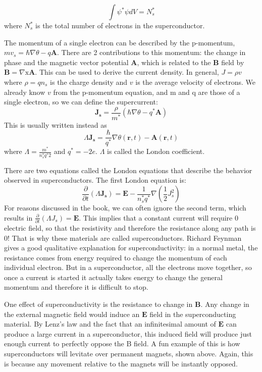 \documentclass[conf]{new-aiaa}
\begin{document}
$$\int \psi^* \psi dV = N_s^*$$ 
where $N_s^*$ is the total number of electrons in the superconductor. \par
The momentum of a single electron can be described by the p-momentum, $mv_s = \hbar \nabla \theta - q \mathbf{A}$. There are 2 contributions to this momentum: the change in phase and the magnetic vector potential $\mathbf{A}$, which is related to the $\mathbf{B}$ field by $\mathbf{B} = \nabla \mathrm{x} \mathbf{A}$.
This can be used to derive the current density. In general, $J = \rho v$ where $\rho = q n_s$ is the charge density and $v$ is the average velocity of electrons. We already know $v$ from the p-momentum equation, and m and q are those of a single electron, so we can define the supercurrent: 
$$\mathbf{J_s} = \frac{\rho}{m^*}(\hbar \nabla \theta - q^* \mathbf{A})$$
This is usually written instead as
$$\Lambda \mathbf{J_s} =\frac{\hbar}{q^*}\nabla\theta(\mathbf{r}, t) - \mathbf{A}(\mathbf{r}, t)$$ 
where $\Lambda = \frac{m^*}{n_s^* q^*2}$ and $q^* = -2e$. $\Lambda$ is called the London coefficient. \par
There are two equations called the London equations that describe the behavior observed in superconductors. The first London equation is:
$$\frac{\partial}{\partial t} (\Lambda \mathbf{J_s}) = \mathbf{E} - \frac{1}{n_s^* q^*} \nabla(\frac{1}{2}J_s^2)$$
For reasons discussed in the book, we can often ignore the second term, which results in $\frac{\partial}{\partial t} (\Lambda J_s) = \mathbf{E}$. This implies that a constant current will require 0 electric field, so that the resistivity and therefore the resistance along any path is 0! That is why these materials are called superconductors. Richard Feynman gives a good qualitative explanation for superconductivity: in a normal metal, the resistance comes from energy required to change the momentum of each individual electron. But in a superconductor, all the electrons move together, so once a current is started it actually takes energy to change the general momentum and therefore it is difficult to stop. \par
One effect of superconductivity is the resistance to change in $\mathbf{B}$. Any change in the external magnetic field would induce an $\mathbf{E}$ field in the superconducting material. By Lenz's law and the fact that an infinitesimal amount of $\mathbf{E}$ can produce a large current in a superconductor, this induced field will produce just enough current to perfectly oppose the B field. A fun example of this is how superconductors will levitate over permanent magnets, shown above. Again, this is because any movement relative to the magnets will be instantly opposed. \par
\end{document}
